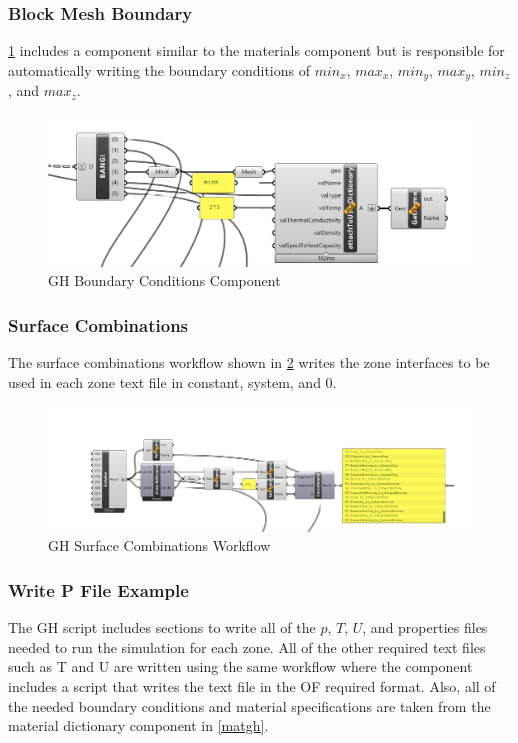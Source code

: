 \subsubsection{Block Mesh Boundary}
\ref{blkmgh} includes a component similar to the materials component but is responsible for automatically writing the boundary conditions of $min_x$, $max_x$, $min_y$, $max_y$, $min_z$, and $max_z$. 

\begin{figure}[tbh]
\centering
\includegraphics[width=0.77\columnwidth]{Figures/bcondgh.png}
\hspace{0.7cm}
\caption{\gls{GH} Boundary Conditions Component}
\label{blkmgh}
\end{figure}




\subsubsection{Surface Combinations}
The surface combinations workflow shown in \ref{surfgh} writes the zone interfaces to be used in each zone text file in constant, system, and 0. 

\begin{figure}[tbh]
\centering
\includegraphics[width=0.77\columnwidth]{Figures/file (8).png}
\hspace{0.7cm}
\caption{\gls{GH} Surface Combinations Workflow}
\label{surfgh}
\end{figure}



\subsubsection{Write P File Example}
The \gls{GH} script includes sections to write all of the $p$, $T$, $U$, and properties files needed to run the simulation for each zone. All of the other required text files such as T and U are written using the same workflow where the component includes a script that writes the text file in the \gls{OF} required format. Also, all of the needed boundary conditions and material specifications are taken from the material dictionary component in \cref{matgh}.


















